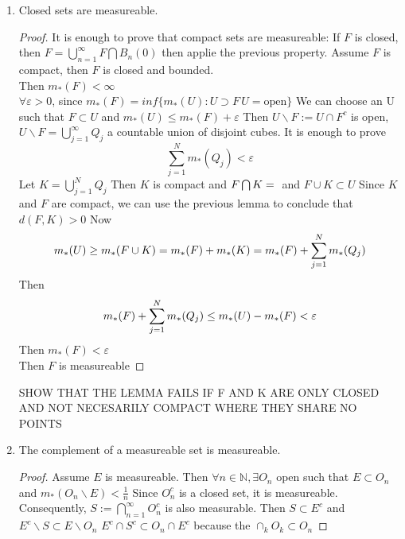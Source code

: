 \documentclass{article}[12 pt]
\begin{document}
\begin{enumerate}
	\item Closed sets are measureable.\\
	      \begin{proof}
		      It is enough to prove that compact sets are measureable:
		      If $F$ is closed, then $F = \bigcup_{n=1}^{\infty}F\bigcap B_n(0)$ then applie the previous property.
		      Assume $F$ is compact, then $F$ is closed and bounded.\\
		      Then $m_{*}(F) < \infty$\\
		      $\forall \varepsilon > 0$, since $m_{*}(F) = inf\{m_{*}(U): U \supset F\, U = \text{open}\}$
		      We can choose an U such that $F \subset U$ and $m_{*}(U) \leq m_{*}(F) + \varepsilon$
		      Then $U\backslash F := U\cap F^{c}$ is open, $U\backslash F = \bigcup_{j=1}^{\infty}Q_j$ a countable union of disjoint cubes. It is enough to prove $$\sum_{j=1}^{N}m_{*}(Q_j) < \varepsilon$$
		      Let $K = \bigcup_{j=1}^{N}Q_j$
		      Then $K$ is compact and $F\bigcap K = \null$ and $F\cup K \subset U$
		      Since $K$ and $F$ are compact, we can use the previous lemma to conclude that $d(F,K) > 0$
		      Now
		      \begin{equation}
			      m_{*}(U) \geq m_{*}(F\cup K) = m_{*}(F) + m_{*}(K) = m_{*}(F) + \sum_{j=1}^{N}m_{*}(Q_j)\\
		      \end{equation}
		      Then
		      \begin{equation}
			      m_{*}(F) + \sum_{j=1}^{N}m_{*}(Q_j) \leq m_{*}(U) - m_{*}(F) < \varepsilon\\
		      \end{equation}
		      Then $m_{*}(F) < \varepsilon$\\
		      Then $F$ is measureable
	      \end{proof}
	      SHOW THAT THE LEMMA FAILS IF F AND K ARE ONLY CLOSED AND NOT NECESARILY COMPACT WHERE THEY SHARE NO POINTS\\
	\item The complement of a measureable set is measureable.
	      \begin{proof}
		      Assume $E$ is measureable.
		      Then $\forall n \in \mathbb{N}, \exists O_n$ open such that $E \subset O_n$ and $m_{*}(O_n\backslash E) < \frac{1}{n}$
		      Since $O_n^{c}$ is a closed set, it is measureable. Consequently, $S:= \bigcap_{n=1}^{\infty}O_n^{c}$ is also measurable.
		      Then $S \subset E^{c}$ and $E^c\backslash S \subset E\backslash O_n$
		      $E^c\cap S^c \subset O_n\cap E^c$ because the $\cap_{k}O_k \subset O_n$

\end{proof}
\end{enumerate}
\end{document}
